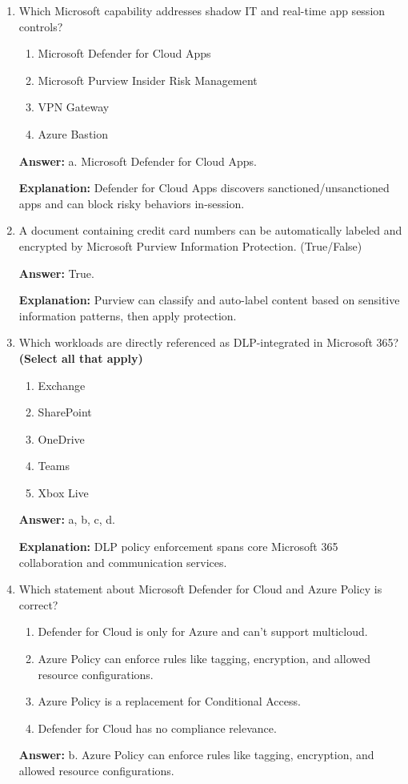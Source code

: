 \documentclass[10pt]{article}
\begin{document}
\begin{enumerate}[leftmargin=*]
\textbf{Explanation:} Intune compliance policies enforce device trust criteria before access is granted.

\item Which Microsoft capability addresses shadow IT and real-time app session controls?
\begin{enumerate}[label=\alph*., leftmargin=1.5em]
\item Microsoft Defender for Cloud Apps
\item Microsoft Purview Insider Risk Management
\item VPN Gateway
\item Azure Bastion
\end{enumerate}
\textbf{Answer:} a. Microsoft Defender for Cloud Apps.

\textbf{Explanation:} Defender for Cloud Apps discovers sanctioned/unsanctioned apps and can block risky behaviors in-session.

\item A document containing credit card numbers can be automatically labeled and encrypted by Microsoft Purview Information Protection. (True/False)

\textbf{Answer:} True.

\textbf{Explanation:} Purview can classify and auto-label content based on sensitive information patterns, then apply protection.

\item Which workloads are directly referenced as DLP-integrated in Microsoft 365? \textbf{(Select all that apply)}
\begin{enumerate}[label=\alph*., leftmargin=1.5em]
\item Exchange
\item SharePoint
\item OneDrive
\item Teams
\item Xbox Live
\end{enumerate}
\textbf{Answer:} a, b, c, d.

\textbf{Explanation:} DLP policy enforcement spans core Microsoft 365 collaboration and communication services.

\item Which statement about Microsoft Defender for Cloud and Azure Policy is correct?
\begin{enumerate}[label=\alph*., leftmargin=1.5em]
\item Defender for Cloud is only for Azure and can't support multicloud.
\item Azure Policy can enforce rules like tagging, encryption, and allowed resource configurations.
\item Azure Policy is a replacement for Conditional Access.
\item Defender for Cloud has no compliance relevance.
\end{enumerate}
\textbf{Answer:} b. Azure Policy can enforce rules like tagging, encryption, and allowed resource configurations.


\end{enumerate}
\end{document}
